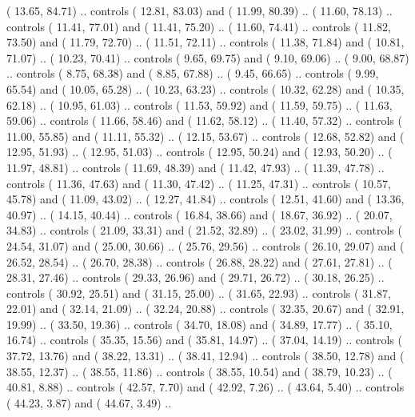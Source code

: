 {        (  13.65,  84.71) .. controls (  12.81,  83.03) and (  11.99,  80.39) ..
        (  11.60,  78.13) .. controls (  11.41,  77.01) and (  11.41,  75.20) ..
        (  11.60,  74.41) .. controls (  11.82,  73.50) and (  11.79,  72.70) ..
        (  11.51,  72.11) .. controls (  11.38,  71.84) and (  10.81,  71.07) ..
        (  10.23,  70.41) .. controls (   9.65,  69.75) and (   9.10,  69.06) ..
        (   9.00,  68.87) .. controls (   8.75,  68.38) and (   8.85,  67.88) ..
        (   9.45,  66.65) .. controls (   9.99,  65.54) and (  10.05,  65.28) ..
        (  10.23,  63.23) .. controls (  10.32,  62.28) and (  10.35,  62.18) ..
        (  10.95,  61.03) .. controls (  11.53,  59.92) and (  11.59,  59.75) ..
        (  11.63,  59.06) .. controls (  11.66,  58.46) and (  11.62,  58.12) ..
        (  11.40,  57.32) .. controls (  11.00,  55.85) and (  11.11,  55.32) ..
        (  12.15,  53.67) .. controls (  12.68,  52.82) and (  12.95,  51.93) ..
        (  12.95,  51.03) .. controls (  12.95,  50.24) and (  12.93,  50.20) ..
        (  11.97,  48.81) .. controls (  11.69,  48.39) and (  11.42,  47.93) ..
        (  11.39,  47.78) .. controls (  11.36,  47.63) and (  11.30,  47.42) ..
        (  11.25,  47.31) .. controls (  10.57,  45.78) and (  11.09,  43.02) ..
        (  12.27,  41.84) .. controls (  12.51,  41.60) and (  13.36,  40.97) ..
        (  14.15,  40.44) .. controls (  16.84,  38.66) and (  18.67,  36.92) ..
        (  20.07,  34.83) .. controls (  21.09,  33.31) and (  21.52,  32.89) ..
        (  23.02,  31.99) .. controls (  24.54,  31.07) and (  25.00,  30.66) ..
        (  25.76,  29.56) .. controls (  26.10,  29.07) and (  26.52,  28.54) ..
        (  26.70,  28.38) .. controls (  26.88,  28.22) and (  27.61,  27.81) ..
        (  28.31,  27.46) .. controls (  29.33,  26.96) and (  29.71,  26.72) ..
        (  30.18,  26.25) .. controls (  30.92,  25.51) and (  31.15,  25.00) ..
        (  31.65,  22.93) .. controls (  31.87,  22.01) and (  32.14,  21.09) ..
        (  32.24,  20.88) .. controls (  32.35,  20.67) and (  32.91,  19.99) ..
        (  33.50,  19.36) .. controls (  34.70,  18.08) and (  34.89,  17.77) ..
        (  35.10,  16.74) .. controls (  35.35,  15.56) and (  35.81,  14.97) ..
        (  37.04,  14.19) .. controls (  37.72,  13.76) and (  38.22,  13.31) ..
        (  38.41,  12.94) .. controls (  38.50,  12.78) and (  38.55,  12.37) ..
        (  38.55,  11.86) .. controls (  38.55,  10.54) and (  38.79,  10.23) ..
        (  40.81,   8.88) .. controls (  42.57,   7.70) and (  42.92,   7.26) ..
        (  43.64,   5.40) .. controls (  44.23,   3.87) and (  44.67,   3.49) ..
}

